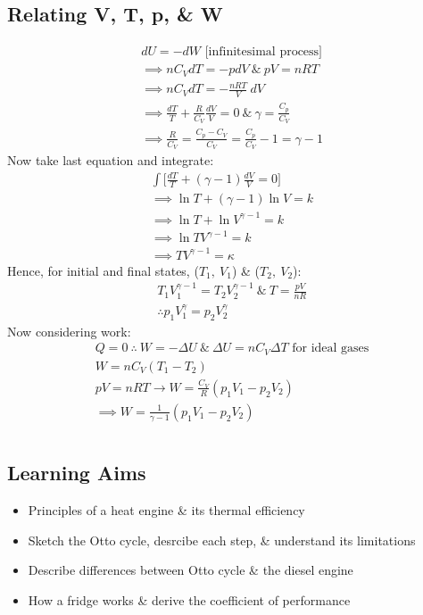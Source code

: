 \documentclass[a4paper, 11pt, normalem]{report}
\begin{document}
\section{Relating V, T, p, \& W}
\vspace{-24pt}
\begin{gather*}
	dU = -dW \text{ [infinitesimal process]} \\
	\implies nC_{V}dT = -pdV ~\&~ pV = nRT \\
	\implies nC_{V}dT = -\frac{nRT}{V}\:dV \\
	\implies \frac{dT}{T} + \frac{R}{C_{V}}\frac{dV}{V} = 0 ~\&~ \gamma = \frac{C_{p}}{C_{V}} \\
	\implies \frac{R}{C_{V}} = \frac{C_{p} - C_{V}}{C_{V}} = \frac{C_{p}}{C_{V}} - 1 = \gamma - 1
\end{gather*}
Now take last equation and integrate:
\begin{gather*}
	\int \bigg[\frac{dT}{T} + (\gamma - 1)\frac{dV}{V} = 0\bigg] \\
	\implies \ln{T} + (\gamma - 1)\ln{V} = k \\
	\implies \ln{T} + \ln{V^{\gamma - 1}} = k \\
	\implies \ln{TV^{\gamma - 1}} = k \\
	\implies TV^{\gamma - 1} = \kappa
\end{gather*}
Hence, for initial and final states, ($T_{1},\:V_{1}$) \& ($T_{2},\:V_{2}$):
\begin{gather*}
	T_{1}V_{1}^{\gamma - 1} = T_{2}V_{2}^{\gamma - 1} ~\&~ T = \frac{pV}{nR} \\
	\therefore p_{1}V_{1}^{\gamma} = p_{2}V_{2}^{\gamma}
\end{gather*}
Now considering work:
\begin{gather*}
	Q = 0 ~\therefore~ W = -{\Delta}U ~\&~ {\Delta}U = nC_{V}{\Delta}T \text{ for ideal gases} \\
	W = nC_{V}(T_{1} - T_{2}) \\
	pV = nRT \rightarrow W = \frac{C_{V}}{R}(p_{1}V_{1} - p_{2}V_{2}) \\
	\implies W = \frac{1}{\gamma - 1}(p_{1}V_{1} - p_{2}V_{2})
\end{gather*}

\chapter{}
\thispagestyle{fancy}
\section{Learning Aims}
\begin{itemize}
	\item Principles of a heat engine \& its thermal efficiency
	\item Sketch the Otto cycle, desrcibe each step, \& understand its limitations
	\item Describe differences between Otto cycle \& the diesel engine
	\item How a fridge works \& derive the coefficient of performance
\end{itemize}
\end{document}
